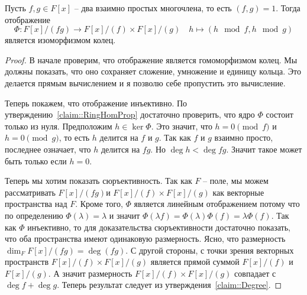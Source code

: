 \begin{claim}
Пусть $f, g\in F[x]$ -- два взаимно простых многочлена, то есть $(f, g) = 1$.
Тогда отображение
\[
\Phi\colon F[x]/(fg) \to F[x]/(f)\times F[x]/(g)\quad h \mapsto (h\!\!\mod{f},h\!\!\mod{g})
\]
является изоморфизмом колец.
\end{claim}
\begin{proof}
В начале проверим, что отображение является гомоморфизмом колец.
Мы должны показать, что оно сохраняет сложение, умножение и единицу кольца.
Это делается прямым вычислением и я позволю себе пропустить это вычисление.

Теперь покажем, что отображение инъективно.
По утверждению~\ref{claim::RingHomProp} достаточно проверить, что ядро $\Phi$ состоит только из нуля.
Предположим $h\in \ker \Phi$.
Это значит, что $h = 0 \pmod f$ и $h = 0 \pmod g$, то есть $h$ делится на $f$ и $g$.
Так как $f$ и $g$ взаимно просто, последнее означает, что $h$ делится на $fg$.
Но $\deg h < \deg fg$.
Значит такое может быть только если $h = 0$.

Теперь мы хотим показать сюръективность.
Так как $F$ -- поле, мы можем рассматривать $F[x]/(fg)$и $F[x]/(f)\times F[x]/(g)$ как векторные пространства над $F$.
Кроме того, $\Phi$ является линейным отображением потому что по определению $\Phi(\lambda) = \lambda$ и значит $\Phi(\lambda f) = \Phi(\lambda)\Phi(f) = \lambda \Phi(f)$.
Так как $\Phi$ инъективно, то для доказательства сюръективности достаточно показать, что оба пространства имеют одинаковую размерность.
Ясно, что размерность $\dim_F F[x]/(fg) = \deg(fg)$.
С другой стороны, с точки зрения векторных пространств $F[x]/(f)\times F[x]/(g)$ является прямой суммой $F[x]/(f)$ и $F[x]/(g)$.
А значит размерность $F[x]/(f)\times F[x]/(g)$ совпадает с $\deg f + \deg g$.
Теперь результат следует из утверждения~\ref{claim::Degree}.
\end{proof}